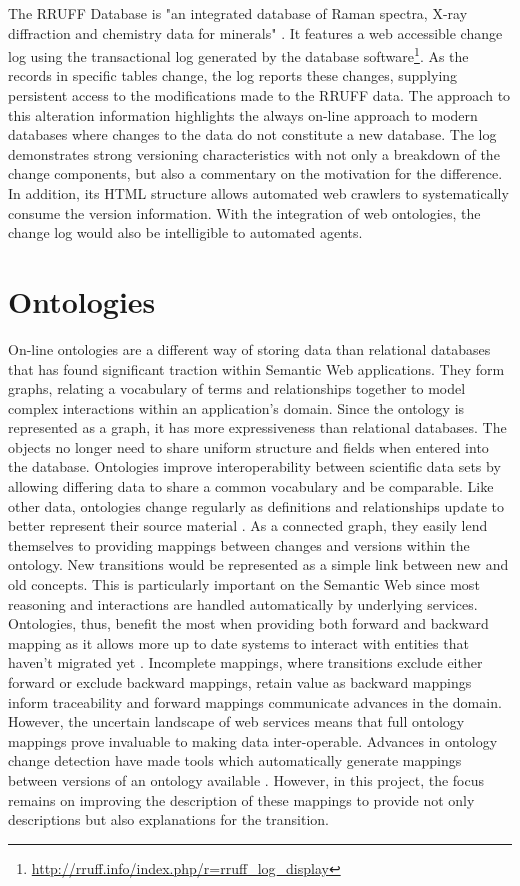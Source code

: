 The RRUFF Database is "an integrated database of Raman spectra, X-ray diffraction and chemistry data for minerals" \cite{Lafuente}.
It features a web accessible change log using the transactional log generated by the database software\footnote{\url{http://rruff.info/index.php/r=rruff_log_display}}.
As the records in specific tables change, the log reports these changes, supplying persistent access to the modifications made to the RRUFF data.
The approach to this alteration information highlights the always on-line approach to modern databases where changes to the data do not constitute a new database.
The log demonstrates strong versioning characteristics with not only a breakdown of the change components, but also a commentary on the motivation for the difference.
In addition, its HTML structure allows automated web crawlers to systematically consume the version information.
With the integration of web ontologies, the change log would also be intelligible to automated agents.

\section{Ontologies}

On-line ontologies are a different way of storing data than relational databases that has found significant traction within Semantic Web applications.
They form graphs, relating a vocabulary of terms and relationships together to model complex interactions within an application's domain.
Since the ontology is represented as a graph, it has more expressiveness than relational databases.
The objects no longer need to share uniform structure and fields when entered into the database.
Ontologies improve interoperability between scientific data sets by allowing differing data to share a common vocabulary and be comparable.
Like other data, ontologies change regularly as definitions and relationships update to better represent their source material \cite{Ochs:2015:SVS:2826733.2826866}.
As a connected graph, they easily lend themselves to providing mappings between changes and versions within the ontology.
New transitions would be represented as a simple link between new and old concepts.
This is particularly important on the Semantic Web since most reasoning and interactions are handled automatically by underlying services.
Ontologies, thus, benefit the most when providing both forward and backward mapping as it allows more up to date systems to interact with entities that haven't migrated yet \cite{Klein01ontologyversioning}.
Incomplete mappings, where transitions exclude either forward or exclude backward mappings, retain value as backward mappings inform traceability and forward mappings communicate advances in the domain.
However, the uncertain landscape of web services means that full ontology mappings prove invaluable to making data inter-operable.
Advances in ontology change detection have made tools which automatically generate mappings between versions of an ontology available \cite{Hartung201315}.
However, in this project, the focus remains on improving the description of these mappings to provide not only descriptions but also explanations for the transition.

